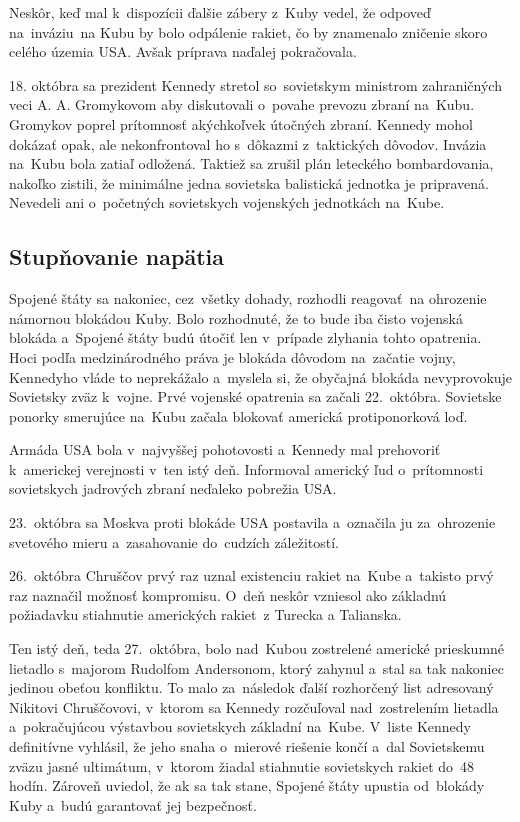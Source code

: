 \documentclass[a4paper]{article}
\begin{document}
Neskôr, keď mal k~dispozícii ďalšie zábery z~Kuby vedel, že odpoveď na~inváziu~na Kubu by bolo odpálenie rakiet, čo by znamenalo zničenie skoro celého územia USA. Avšak príprava naďalej pokračovala.

18. októbra sa prezident Kennedy stretol so~sovietskym ministrom zahraničných veci A. A. Gromykovom aby diskutovali o~povahe prevozu zbraní na~Kubu. Gromykov poprel prítomnosť akýchkoľvek útočných zbraní. Kennedy mohol dokázať opak, ale nekonfrontoval ho s~dôkazmi z~taktických dôvodov. Invázia na~Kubu bola zatiaľ odložená. Taktiež sa zrušil plán leteckého bombardovania, nakoľko zistili, že minimálne jedna sovietska balistická jednotka je pripravená. Nevedeli ani o~početných sovietskych vojenských jednotkách na~Kube.

\subsection{Stupňovanie napätia}
Spojené štáty sa nakoniec, cez~všetky dohady, rozhodli reagovať~na ohrozenie námornou blokádou Kuby. Bolo rozhodnuté, že to bude iba čisto vojenská blokáda a~Spojené štáty budú útočiť len v~prípade zlyhania tohto opatrenia. Hoci podľa medzinárodného práva je 
blokáda dôvodom na~začatie vojny, Kennedyho vláde to neprekážalo a~myslela si, že obyčajná blokáda nevyprovokuje Sovietsky zväz k~vojne. Prvé vojenské opatrenia sa začali 22.~októbra. Sovietske ponorky smerujúce na~Kubu začala blokovať americká protiponorková loď.

Armáda USA bola v~najvyššej pohotovosti a~Kennedy mal prehovoriť k~americkej verejnosti v~ten istý deň. Informoval americký ľud o~prítomnosti sovietskych jadrových zbraní neďaleko pobrežia USA.

23.~októbra sa Moskva proti blokáde USA postavila a~označila ju za~ohrozenie svetového mieru a~zasahovanie do~cudzích záležitostí.

26.~októbra Chruščov prvý raz uznal existenciu rakiet na~Kube a~takisto prvý raz naznačil možnosť kompromisu. O~deň neskôr vzniesol ako základnú požiadavku stiahnutie amerických rakiet~z Turecka a Talianska. 

Ten istý deň, teda 27.~októbra, bolo nad~Kubou zostrelené americké prieskumné lietadlo s~majorom Rudolfom Andersonom, ktorý zahynul a~stal sa tak nakoniec jedinou obeťou konfliktu. To malo za~následok ďalší rozhorčený list adresovaný Nikitovi Chruščovovi, v~ktorom sa Kennedy rozčuľoval nad~zostrelením lietadla a~pokračujúcou výstavbou sovietskych základní na~Kube. V~liste Kennedy definitívne vyhlásil, že jeho snaha o~mierové riešenie končí a~dal Sovietskemu zväzu jasné ultimátum, v~ktorom žiadal stiahnutie sovietskych rakiet do~48 hodín. Zároveň uviedol, že ak sa tak stane, Spojené štáty upustia od~blokády Kuby a~budú garantovať jej bezpečnosť.
\end{document}
